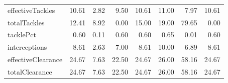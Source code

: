 \begin{table}[H]
\begin{tabular}{lrrrrrrr}
effectiveTackles & 10.61 & 2.82 & 9.50 & 10.61 & 11.00 & 7.97 & 10.61 \\
totalTackles & 12.41 & 8.92 & 0.00 & 15.00 & 19.00 & 79.65 & 0.00 \\
tacklePct & 0.60 & 0.11 & 0.60 & 0.60 & 0.65 & 0.01 & 0.60 \\
interceptions & 8.61 & 2.63 & 7.00 & 8.61 & 10.00 & 6.89 & 8.61 \\
effectiveClearance & 24.67 & 7.63 & 22.50 & 24.67 & 26.00 & 58.16 & 24.67 \\
totalClearance & 24.67 & 7.63 & 22.50 & 24.67 & 26.00 & 58.16 & 24.67 \\
\hline
\end{tabular}
\end{table}
